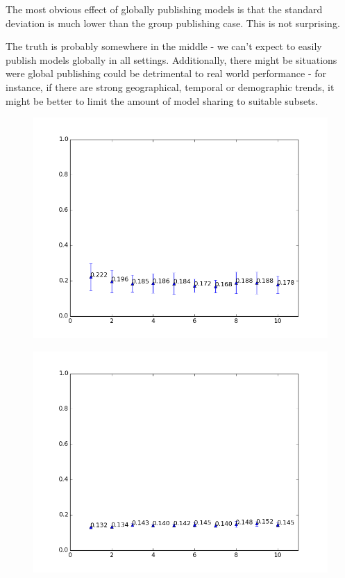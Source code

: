 The most obvious effect of globally publishing models is that the standard deviation is much lower than the group publishing case. This is not surprising.

The truth is probably somewhere in the middle - we can't expect to easily publish models globally in all settings. Additionally, there might be situations were global publishing could be detrimental to real world performance - for instance, if there are strong geographical, temporal or demographic trends, it might be better to limit the amount of model sharing to suitable subsets.

\begin{figure}[h!]
	\centering
	\begin{minipage}{.49\linewidth}
		\includegraphics[width=\linewidth]{fig/PartyAllComparisonSpam-eps1.0,budg=eps,peers30,groups1-10,reg2e-2-pubParty-newAggregationStyleTEST.png}
		\label{fig:RegRangeTestPubParty}
	\end{minipage}
	\hspace{.001\linewidth}
	\begin{minipage}{.49\linewidth}
		\includegraphics[width=\linewidth]{fig/PartyAllComparisonSpam-eps1.0,budg=eps,peers30,groups1-10,reg2e-2-pubAll-newAggregationStyleTEST.png}

\end{minipage}
\end{figure}

